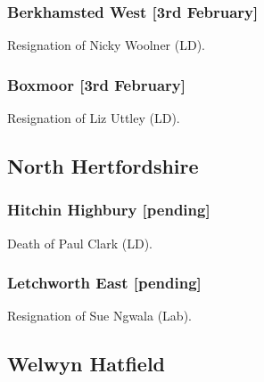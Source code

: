\documentclass[a4paper,openany]{book}
\begin{document}
\begin{resultsiii}
\subsubsection*{Berkhamsted West \hspace*{\fill}\nolinebreak[1]%
	\enspace\hspace*{\fill}
	[3rd February]}


Resignation of Nicky Woolner (LD).

\subsubsection*{Boxmoor \hspace*{\fill}\nolinebreak[1]%
	\enspace\hspace*{\fill}
	[3rd February]}


Resignation of Liz Uttley (LD).

\subsection*{North Hertfordshire}

\subsubsection*{Hitchin Highbury \hspace*{\fill}\nolinebreak[1]%
	\enspace\hspace*{\fill}
	[pending]}


Death of Paul Clark (LD).

\subsubsection*{Letchworth East \hspace*{\fill}\nolinebreak[1]%
	\enspace\hspace*{\fill}
	[pending]}


Resignation of Sue Ngwala (Lab).

\subsection*{Welwyn Hatfield}


\end{resultsiii}
\end{document}
